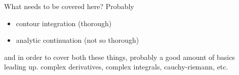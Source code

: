\documentclass{book}
\begin{document}
What needs to be covered here? Probably
\begin{itemize}
\item contour integration (thorough)

\item analytic continuation (not so thorough)
\end{itemize}
and in order to cover both these things, probably a good amount of basics leading up. complex derivatives, complex integrals, cauchy-riemann, etc.
\end{document}
